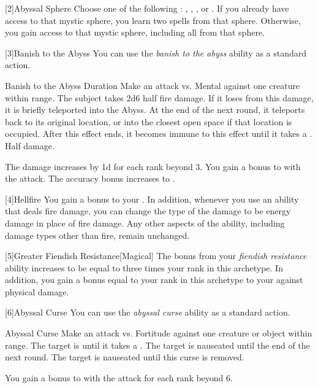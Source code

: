         [2]{Abyssal Sphere} Choose one of the following : , , , or .
        If you already have access to that mystic sphere, you learn two spells from that sphere.
        Otherwise, you gain access to that mystic sphere, including all  from that sphere.

        [3]{Banish to the Abyss} You can use the \textit{banish to the abyss} ability as a standard action.
        \begin{durationability}{Banish to the Abyss}
            Duration
            \rankline
            Make an attack vs. Mental against one creature within \rngmed range.
            \hit The subject takes 2d6 \add half  fire damage.
            If it loses  from this damage, it is briefly teleported into the Abyss.
            At the end of the next round, it teleports back to its original location, or into the closest open space if that location is occupied.
            After this effect ends, it becomes immune to this effect until it takes a .
            \glance Half damage.

            \rankline
            The damage increases by \plus1d for each rank beyond 3.
             You gain a  bonus to  with the attack.
             The accuracy bonus increases to .
        \end{durationability}

        [4]{Hellfire} You gain a  bonus to your  .
        In addition, whenever you use an ability that deals fire damage, you can change the type of the damage to be energy damage in place of fire damage.
        Any other aspects of the ability, including damage types other than fire, remain unchanged.

        [5]{Greater Fiendish Resistance}[Magical] The bonus from your \textit{fiendish resistance} ability increases to be equal to three times your rank in this archetype.
        In addition, you gain a bonus equal to your rank in this archetype to your  against physical damage.

        [6]{Abyssal Curse} You can use the \textit{abyssal curse} ability as a standard action.
        \begin{durationability}{Abyssal Curse}
            \rankline
            Make an attack vs. Fortitude against one creature or object within \rngmed range.
            \hit The target is \nauseated until it takes a .
            \glance The target is nauseated until the end of the next round.
            \crit The target is nauseated until this curse is removed.

            \rankline
            You gain a  bonus to  with the attack for each rank beyond 6.
        \end{durationability}

